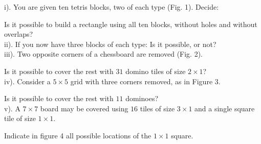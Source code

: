 \begin{multicols}{2}
i). You are given ten tetris blocks, two of each type (Fig. 1). Decide:

Is it possible to build a rectangle using all ten blocks, without holes and without overlaps?\\


ii). If you now have three blocks of each type: Is it possible, or not?\\


iii). Two opposite corners of a chessboard are removed (Fig. 2).  

Is it possible to cover the rest with $31$ domino tiles of size $2\times 1$?\\


iv). Consider a $5\times 5$ grid with three corners removed, as in Figure 3.
  
Is it possible to cover the rest with $11$ dominoes?\\


v). A $7\times 7$ board may be covered using $16$ tiles of size $3\times 1$ and a single square tile of size $1\times 1$.

Indicate in figure 4 all possible locations of the $1\times 1$ square.


\columnbreak


\end{multicols}
